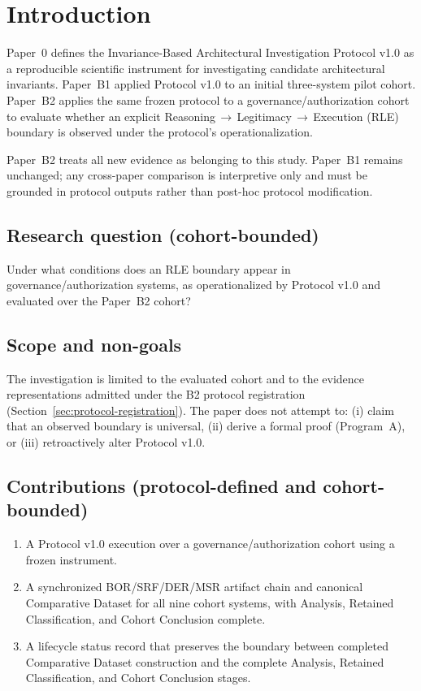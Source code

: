 \section{Introduction}
Paper~0 defines the Invariance-Based Architectural Investigation Protocol v1.0 as a reproducible scientific instrument for investigating candidate architectural invariants. Paper~B1 applied Protocol v1.0 to an initial three-system pilot cohort. Paper~B2 applies the same frozen protocol to a governance/authorization cohort to evaluate whether an explicit Reasoning\,$\rightarrow$\,Legitimacy\,$\rightarrow$\,Execution (RLE) boundary is observed under the protocol's operationalization.

Paper~B2 treats all new evidence as belonging to this study. Paper~B1 remains unchanged; any cross-paper comparison is interpretive only and must be grounded in protocol outputs rather than post-hoc protocol modification.

\subsection{Research question (cohort-bounded)}
Under what conditions does an RLE boundary appear in governance/authorization systems, as operationalized by Protocol v1.0 and evaluated over the Paper~B2 cohort?

\subsection{Scope and non-goals}
The investigation is limited to the evaluated cohort and to the evidence representations admitted under the B2 protocol registration (Section~\ref{sec:protocol-registration}). The paper does not attempt to:
(i) claim that an observed boundary is universal,
(ii) derive a formal proof (Program~A), or
(iii) retroactively alter Protocol v1.0.

\subsection{Contributions (protocol-defined and cohort-bounded)}
\begin{enumerate}
  \item A Protocol v1.0 execution over a governance/authorization cohort using a frozen instrument.
  \item A synchronized BOR/SRF/DER/MSR artifact chain and canonical Comparative Dataset for all nine cohort systems, with Analysis, Retained Classification, and Cohort Conclusion complete.
  \item A lifecycle status record that preserves the boundary between completed Comparative Dataset construction and the complete Analysis, Retained Classification, and Cohort Conclusion stages.
\end{enumerate}

